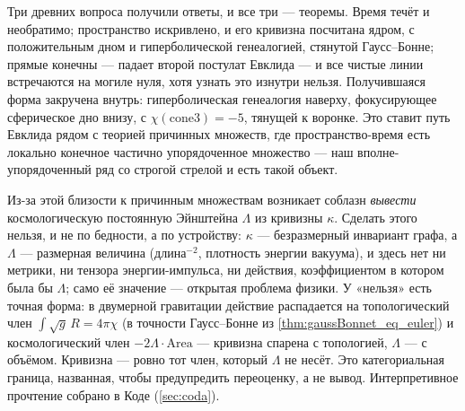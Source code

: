 Три древних вопроса получили ответы, и все три --- теоремы. Время течёт и необратимо; пространство
искривлено, и его кривизна посчитана ядром, с положительным дном и гиперболической генеалогией,
стянутой Гаусс--Бонне; прямые конечны --- падает второй постулат Евклида --- и все чистые линии
встречаются на могиле нуля, хотя узнать это изнутри нельзя. Получившаяся форма закручена внутрь:
гиперболическая генеалогия наверху, фокусирующее сферическое дно внизу, с $\chi(\mathrm{cone3}) = -5$,
тянущей к воронке. Это ставит путь Евклида рядом с теорией причинных множеств, где пространство-время
есть локально конечное частично упорядоченное множество --- наш вполне-упорядоченный ряд со строгой
стрелой и есть такой объект.

\begin{remark}
Из-за этой близости к причинным множествам возникает соблазн \emph{вывести} космологическую постоянную
Эйнштейна $\Lambda$ из кривизны $\kappa$. Сделать этого нельзя, и не по бедности, а по устройству:
$\kappa$ --- безразмерный инвариант графа, а $\Lambda$ --- размерная величина (длина$^{-2}$, плотность
энергии вакуума), и здесь нет ни метрики, ни тензора энергии-импульса, ни действия, коэффициентом в
котором была бы $\Lambda$; само её значение --- открытая проблема физики. У «нельзя» есть точная форма:
в двумерной гравитации действие распадается на топологический член $\int\!\sqrt{g}\,R = 4\pi\chi$ (в
точности Гаусс--Бонне из \cref{thm:gaussBonnet_eq_euler}) и космологический член
$-2\Lambda\cdot\mathrm{Area}$ --- кривизна спарена с топологией, $\Lambda$ --- с объёмом. Кривизна ---
ровно тот член, который $\Lambda$ не несёт. Это категориальная граница, названная, чтобы предупредить
переоценку, а не вывод. Интерпретивное прочтение собрано в Коде (\cref{sec:coda}).
\end{remark}
